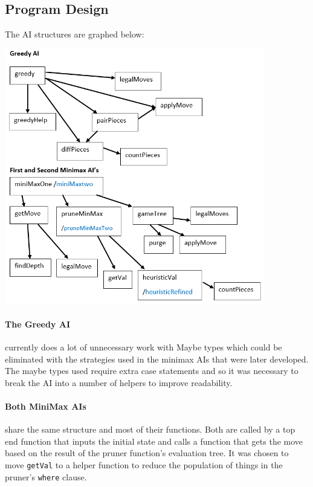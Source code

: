 \documentclass[11pt]{article}
\begin{document}
\subsection*{Program Design}
The AI structures are graphed below:
\begin{center}
  \includegraphics[width=0.85\textwidth]{functDep.png}
\end{center}

\paragraph{The Greedy AI} currently does a lot of unnecessary work with Maybe types which could be eliminated with the strategies used in the minimax AIs that were later developed. The maybe types used require extra case statements and so it was necessary to break the AI into a number of helpers to improve readability.

\paragraph{Both MiniMax AIs} share the same structure and most of their functions. Both are called by a top end function that inputs the initial state and calls a function that gets the move based on the result of the pruner function's evaluation tree. It was chosen to move \verb|getVal| to a helper function to reduce the population of things in the pruner's \verb|where| clause.
\end{document}
